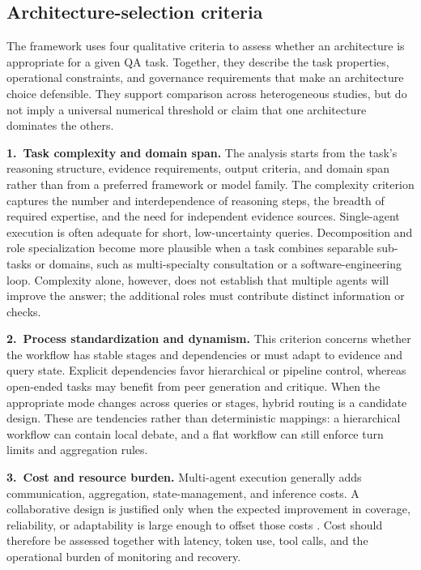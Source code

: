 \documentclass[a4paper,fleqn]{cas-dc}
\begin{document}
\subsection{Architecture-selection criteria}
\label{sec:decision_factors}

The framework uses four qualitative criteria to assess whether an
architecture is appropriate for a given QA task. Together, they describe the
task properties, operational constraints, and governance requirements that
make an architecture choice defensible. They support comparison across
heterogeneous studies, but do not imply a universal numerical threshold or
claim that one architecture dominates the others.

\textbf{1.\ Task complexity and domain span.} The analysis starts
from the task's reasoning structure, evidence requirements, output criteria,
and domain span rather than from a preferred framework or model family. The
complexity criterion captures the number and interdependence of reasoning
steps, the breadth of required expertise, and the need for independent
evidence sources. Single-agent execution is often adequate for short,
low-uncertainty queries. Decomposition and role specialization become more
plausible when a task combines separable sub-tasks or domains, such as
multi-specialty consultation or a software-engineering loop. Complexity alone,
however, does not establish that multiple agents will improve the answer; the
additional roles must contribute distinct information or checks.

\textbf{2.\ Process standardization and dynamism.} This criterion concerns
whether the workflow has stable stages and dependencies or must adapt to
evidence and query state. Explicit dependencies favor hierarchical or
pipeline control, whereas open-ended tasks may benefit from peer generation
and critique. When the appropriate mode changes across queries or stages,
hybrid routing is a candidate design. These are tendencies rather than
deterministic mappings: a hierarchical workflow can contain local debate, and
a flat workflow can still enforce turn limits and aggregation rules.

\textbf{3.\ Cost and resource burden.} Multi-agent execution generally adds
communication, aggregation, state-management, and inference costs. A
collaborative design is justified only when the expected improvement in
coverage, reliability, or adaptability is large enough to offset those costs
\citep{han2024mast}. Cost should therefore be assessed together with latency,
token use, tool calls, and the operational burden of monitoring and recovery.
\end{document}
